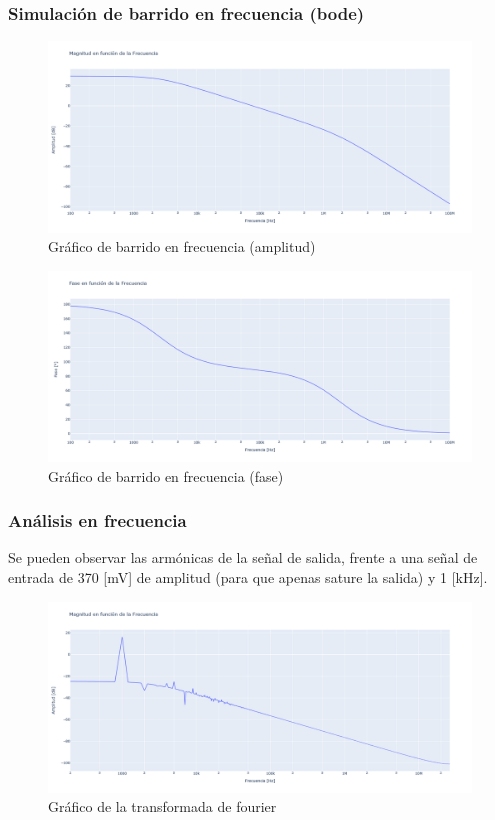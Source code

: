 \subsubsection{Simulación de barrido en frecuencia (bode)}
\begin{figure}[h!]
    \centering
    \includegraphics[width=0.80\linewidth]{img/Lab2_1b_Bode_amp.png}
    \caption{Gráfico de barrido en frecuencia (amplitud)}
    \label{fig:bode1a}
\end{figure}

\newpage

\begin{figure}[h!]
    \centering
    \includegraphics[width=0.80\linewidth]{img/Lab2_1b_Bode_fase.png}
    \caption{Gráfico de barrido en frecuencia (fase)}
    \label{fig:bode1f}
\end{figure}

\subsubsection{Análisis en frecuencia }

Se pueden observar las armónicas de la señal de salida, frente a una señal de entrada de 370 [mV] de amplitud (para que apenas sature la salida) y 1 [kHz].
\begin{figure}[h!]
    \centering
    \includegraphics[width=0.80\linewidth]{img/Lab2_1b_Fourier.png}
    \caption{Gráfico de la transformada de fourier}
    \label{fig:fft}
\end{figure}

